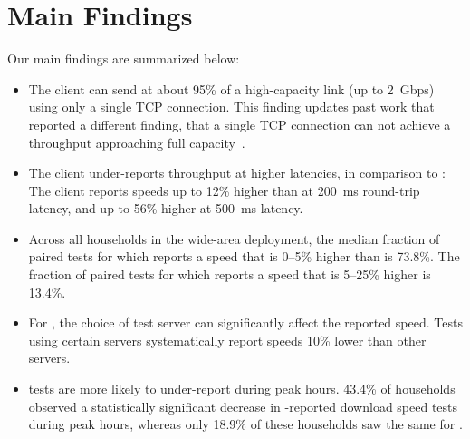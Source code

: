 \section{Main Findings} \label{sec:findings}

Our main findings are summarized below:
\begin{itemize}
    \item   The \ndt client can send at about 95\% of a high-capacity link (up to
			2~Gbps) using only a single TCP connection. This finding updates past work
			that reported a different finding, that a single TCP connection can not achieve a
			throughput approaching full capacity~\cite{feamster2020measuring}.
			
	\item	The \ndt client under-reports throughput at higher latencies, in comparison
			to \ookla: The \ookla client reports speeds up to 12\% higher than \ndt at
			200~ms round-trip latency, and up to 56\% higher at 500~ms latency.
			
    \item	Across all households in the wide-area deployment, the median fraction of paired tests 
			for which \ookla
			reports a speed that is 0--5\% higher than \ndt is 73.8\%. The fraction of
			paired tests for which \ookla reports a speed that is 5--25\% higher is
			13.4\%.
			
	\item 	For \ookla, the choice of test server can significantly affect the reported
			speed. Tests using certain \ookla servers systematically report speeds 10\%
			lower than other servers.
			
	\item	\ndt tests are more likely to under-report during peak hours. 43.4\% of
			households observed a statistically significant decrease in \ndt-reported
			download speed tests during peak hours, whereas only 18.9\% of these
			households saw the same for \ookla.
\end{itemize}


